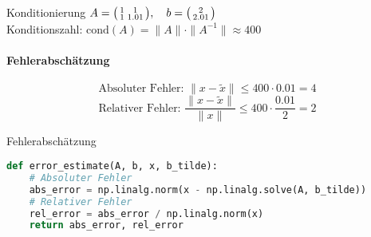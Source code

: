 \begin{example2}{Konditionierung}
$A = \begin{psmallmatrix}
1 & 1\\
1 & 1.01
\end{psmallmatrix}, \quad b = \begin{psmallmatrix}
2\\
2.01
\end{psmallmatrix}$
\vspace{2mm}\\
Konditionszahl:
$\text{cond}(A) = \|A\| \cdot \|A^{-1}\| \approx 400$
\paragraph{Fehlerabschätzung}
$$\text{Absoluter Fehler: }\|x - \tilde{x}\| \leq 400 \cdot 0.01 = 4$$
$$\text{Relativer Fehler: }\frac{\|x - \tilde{x}\|}{\|x\|} \leq 400 \cdot \frac{0.01}{2} = 2$$
\end{example2}

\begin{examplecode}{Fehlerabschätzung}
\begin{lstlisting}[language=Python, style=basesmol]
def error_estimate(A, b, x, b_tilde):
    # Absoluter Fehler
    abs_error = np.linalg.norm(x - np.linalg.solve(A, b_tilde))
    # Relativer Fehler
    rel_error = abs_error / np.linalg.norm(x)
    return abs_error, rel_error
\end{lstlisting}
\end{examplecode}

